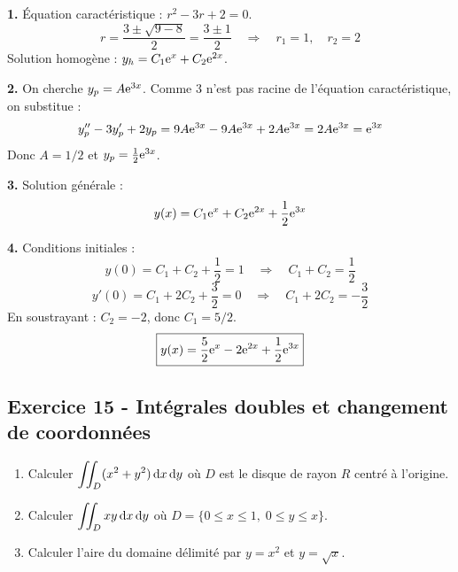 \documentclass[12pt,a4paper]{article}
\begin{document}
\begin{boitecorrige}
\textbf{1.} Équation caractéristique : $r^2 - 3r + 2 = 0$.
\[
r = \frac{3 \pm \sqrt{9-8}}{2} = \frac{3 \pm 1}{2} \quad \Rightarrow \quad r_1 = 1, \quad r_2 = 2
\]
Solution homogène : $y_h = C_1 \mathrm{e}^{x} + C_2 \mathrm{e}^{2x}$.

\textbf{2.} On cherche $y_p = A\mathrm{e}^{3x}$. Comme $3$ n'est pas racine de l'équation caractéristique, on substitue :
\[
y_p'' - 3y_p' + 2y_p = 9A\mathrm{e}^{3x} - 9A\mathrm{e}^{3x} + 2A\mathrm{e}^{3x} = 2A\mathrm{e}^{3x} = \mathrm{e}^{3x}
\]
Donc $A = 1/2$ et $y_p = \frac{1}{2}\mathrm{e}^{3x}$.

\textbf{3.} Solution générale :
\[
y(x) = C_1\mathrm{e}^{x} + C_2\mathrm{e}^{2x} + \frac{1}{2}\mathrm{e}^{3x}
\]

\textbf{4.} Conditions initiales :
\[
y(0) = C_1 + C_2 + \frac{1}{2} = 1 \quad \Rightarrow \quad C_1 + C_2 = \frac{1}{2}
\]
\[
y'(0) = C_1 + 2C_2 + \frac{3}{2} = 0 \quad \Rightarrow \quad C_1 + 2C_2 = -\frac{3}{2}
\]
En soustrayant : $C_2 = -2$, donc $C_1 = 5/2$.
\[
\boxed{y(x) = \frac{5}{2}\mathrm{e}^{x} - 2\mathrm{e}^{2x} + \frac{1}{2}\mathrm{e}^{3x}}
\]
\end{boitecorrige}

\subsection*{Exercice 15 - Intégrales doubles et changement de coordonnées \niveau{\difficile}}

\begin{boiteexercice}
\begin{enumerate}
  \item Calculer $\displaystyle\iint_D (x^2+y^2)\,\mathrm{d} x\,\mathrm{d} y$ où $D$ est le disque de rayon $R$ centré à l'origine.
  \item Calculer $\displaystyle\iint_D xy\,\mathrm{d} x\,\mathrm{d} y$ où $D = \{0\leq x\leq 1,\; 0\leq y\leq x\}$.
  \item Calculer l'aire du domaine délimité par $y = x^2$ et $y = \sqrt{x}$.
\end{enumerate}
\end{boiteexercice}
\end{document}
